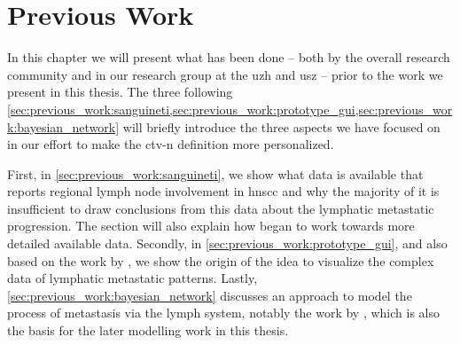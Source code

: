 \documentclass[\relativeRoot/main.tex]{subfiles}
\begin{document}
\chapter{Previous Work}
\label{chap:previous_work}

In this chapter we will present what has been done -- both by the overall research community and in our research group at the \gls{uzh} and \gls{usz} -- prior to the work we present in this thesis. The three following \cref{sec:previous_work:sanguineti,sec:previous_work:prototype_gui,sec:previous_work:bayesian_network} will briefly introduce the three aspects we have focused on in our effort to make the \acrfull{ctv-n} definition more personalized.

First, in \cref{sec:previous_work:sanguineti}, we show what data is available that reports regional lymph node involvement in \gls{hnscc} and why the majority of it is insufficient to draw conclusions from this data about the lymphatic metastatic progression. The section will also explain how  began to work towards more detailed available data. Secondly, in \cref{sec:previous_work:prototype_gui}, and also based on the work by , we show the origin of the idea to visualize the complex data of lymphatic metastatic patterns. Lastly, \cref{sec:previous_work:bayesian_network} discusses an approach to model the process of metastasis via the lymph system, notably the work by , which is also the basis for the later modelling work in this thesis.





\end{document}
